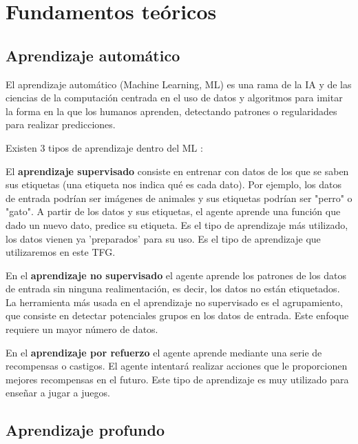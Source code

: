 \chapter{Fundamentos teóricos}
\thispagestyle{empty}

\section{Aprendizaje automático}
El aprendizaje automático (Machine Learning, ML) \cite{20,21} es una rama de la IA y de las ciencias de la computación centrada en el uso de datos y algoritmos para imitar la forma en la que los humanos aprenden, detectando patrones o regularidades para realizar predicciones.

Existen 3 tipos de aprendizaje dentro del ML \cite{22,23}:

El \textbf{aprendizaje supervisado} consiste en entrenar con datos de los que se saben sus etiquetas (una etiqueta nos indica qué es cada dato). Por ejemplo, los datos de entrada podrían ser imágenes de animales y sus etiquetas podrían ser "perro" o "gato". A partir de los datos y sus etiquetas, el agente aprende una función que dado un nuevo dato, predice su etiqueta. Es el tipo de aprendizaje más utilizado, los datos vienen ya 'preparados' para su uso. Es el tipo de aprendizaje que utilizaremos en este TFG.

En el \textbf{aprendizaje no supervisado} el agente aprende los patrones de los datos de entrada sin ninguna realimentación, es decir, los datos no están etiquetados. La herramienta más usada en el aprendizaje no supervisado es el agrupamiento, que consiste en detectar potenciales grupos en los datos de entrada. Este enfoque requiere un mayor número de datos.

En el \textbf{aprendizaje por refuerzo} el agente aprende mediante una serie de recompensas o castigos. El agente intentará realizar acciones que le proporcionen mejores recompensas en el futuro. Este tipo de aprendizaje es muy utilizado para enseñar a jugar a juegos.

\section{Aprendizaje profundo}

